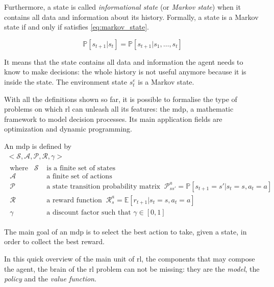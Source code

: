 Furthermore, a state is called \textit{informational state} (or \textit{Markov state}) when it contains all data and information about its history. Formally, a state is a Markov state if and only if satisfies \vref{eq:markov_state}.

\begin{equation} \label{eq:markov_state}
	\mathbb{P}[s_{t+1}| s_t] = \mathbb{P}[s_{t+1} | s_1, \dots, s_t]
\end{equation}

 It means that the state contains all data and information the agent needs to know to make decisions: the whole history is not useful anymore because it is inside the state. The environment state $s_t^e$ is a Markov state.
 
 With all the definitions shown so far, it is possible to formalise the type of problems on which \acrshort{rl} can unleash all its features: the \acrfull{mdp}, a mathematic framework to model decision processes. Its main application fields are optimization and dynamic programming.
 
 An \acrshort{mdp} is defined by 
 \begin{equation}\label{eq:mdp}
 \begin{gathered} 
 <\mathcal{S}, \mathcal{A}, \mathcal{P}, \mathcal{R}, \gamma>\\
 \begin{aligned}
 	\text{where}\hspace{10pt} \mathcal{S} & \text{ is a finite set of states} \\
 	\mathcal{A} & \text{ a finite set of actions} \\
 	\mathcal{P} & \text{ a state transition probability matrix}\;\;
 	 \mathcal{P}_{ss'}^a = \mathbb{P}[s_{t+1}= s' | s_t = s, a_t = a]\\
 	\mathcal{R} & \text{ a reward function}
 	 	\;\; \mathcal{R}_{s}^a = \mathbb{E}[r_{t+1} | s_t = s, a_t = a] \\
 	 \gamma & \text{ a discount factor such that } \gamma \in [0,1]
 \end{aligned}
 \end{gathered}
 \end{equation}


The main goal of an \acrshort{mdp} is to select the best action to take, given a state, in order to collect the best reward. 

In this quick overview of the main unit of \acrshort{rl}, the components that may compose the agent, the brain of the \acrshort{rl} problem can not be missing: they are the \textit{model}, the \textit{policy} and the \textit{value function}.

